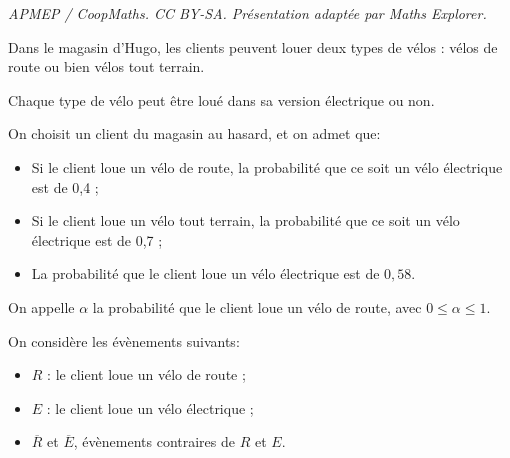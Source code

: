 \documentclass[10pt]{article}
\begin{document}
\noindent\textit{APMEP / CoopMaths. CC BY-SA. Présentation adaptée par Maths Explorer.}\par\medskip
\medskip

Dans le magasin d'Hugo, les clients peuvent louer deux types de vélos : vélos de route ou bien vélos tout terrain. 

Chaque type de vélo peut être loué dans sa version électrique ou non.

On choisit un client du magasin au hasard, et on admet que:
\begin{itemize}
\item Si le client loue un vélo de route, la probabilité que ce soit un vélo électrique est de 0,4 ;
\item Si le client loue un vélo tout terrain, la probabilité que ce soit un vélo électrique est de 0,7 ; 
\item La probabilité que le client loue un vélo électrique est de $0,58$.
\end{itemize}

\medskip

On appelle $\alpha$ la probabilité que le client loue un vélo de route, avec $0 \leqslant \alpha \leqslant 1$. 

On considère les évènements suivants:

\begin{itemize}
\item[$\bullet~~$] $R$ : \og le client loue un vélo de route \fg{} ;
\item[$\bullet~~$] $E$ : \og le client loue un vélo électrique \fg{} ;
\item[$\bullet~~$] $\overline{R}$ et $\overline{E}$, évènements contraires de $R$ et $E$.
\end{itemize}
\end{document}

